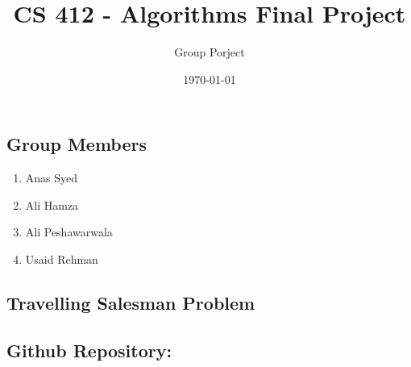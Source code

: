 \documentclass{article}
\title{CS 412 - Algorithms Final Project}
\author{Group Porject}
\date{\today}
\begin{document}
    \maketitle
\subsection*{Group Members}
\begin{enumerate}
    \item Anas Syed
    \item Ali Hamza
    \item Ali Peshawarwala
    \item Usaid Rehman
\end{enumerate}
\subsection*{Travelling Salesman Problem}
\subsection*{Github Repository:}
    
\end{document}
